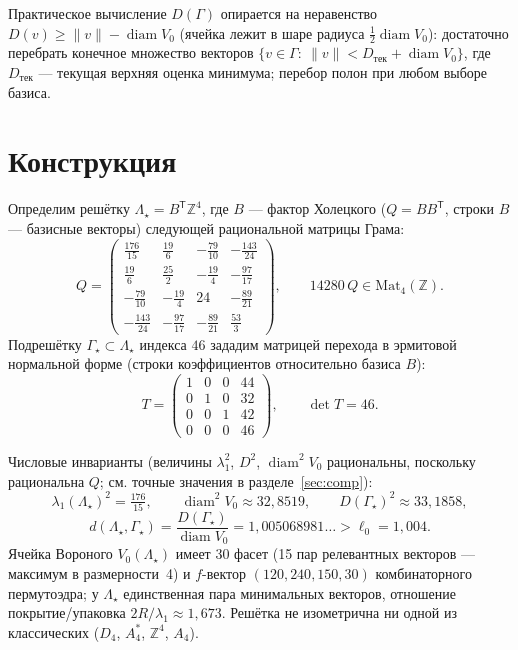 \documentclass[12pt]{article}
\theoremstyle{definition}
\theoremstyle{remark}
\newcommand{\Z}{\mathbb{Z}}
\newcommand{\diam}{\operatorname{diam}}
\begin{document}
Практическое вычисление $D(\Gamma)$ опирается на неравенство
$D(v)\ge\|v\|-\diam V_0$ (ячейка лежит в шаре радиуса $\tfrac12\diam V_0$):
достаточно перебрать конечное множество векторов
$\{v\in\Gamma:\ \|v\|<D_{\text{тек}}+\diam V_0\}$, где $D_{\text{тек}}$ ---
текущая верхняя оценка минимума; перебор полон при любом выборе базиса.

\section{Конструкция}\label{sec:construction}

Определим решётку $\Lambda_\star=B^{\mathsf T}\Z^4$, где $B$ --- фактор
Холецкого ($Q=BB^{\mathsf T}$, строки $B$ --- базисные векторы) следующей
рациональной матрицы Грама:
\begin{equation}\label{eq:gram}
Q=\begin{pmatrix}
\tfrac{176}{15} & \tfrac{19}{6}  & -\tfrac{79}{10} & -\tfrac{143}{24}\\[2pt]
\tfrac{19}{6}   & \tfrac{25}{2}  & -\tfrac{19}{4}  & -\tfrac{97}{17}\\[2pt]
-\tfrac{79}{10} & -\tfrac{19}{4} & 24              & -\tfrac{89}{21}\\[2pt]
-\tfrac{143}{24}& -\tfrac{97}{17}& -\tfrac{89}{21} & \tfrac{53}{3}
\end{pmatrix},
\qquad
14280\,Q\in\mathrm{Mat}_4(\Z).
\end{equation}
Подрешётку $\Gamma_\star\subset\Lambda_\star$ индекса $46$ зададим матрицей
перехода в эрмитовой нормальной форме (строки коэффициентов относительно
базиса $B$):
\begin{equation}\label{eq:hnf}
T=\begin{pmatrix}
1&0&0&44\\
0&1&0&32\\
0&0&1&42\\
0&0&0&46
\end{pmatrix},
\qquad \det T=46 .
\end{equation}

Числовые инварианты (величины $\lambda_1^2$, $D^2$, $\diam^2 V_0$ рациональны,
поскольку рациональна $Q$; см. точные значения в разделе~\ref{sec:comp}):
\[
\lambda_1(\Lambda_\star)^2=\tfrac{176}{15},\qquad
\diam^2 V_0\approx 32{,}8519,\qquad
D(\Gamma_\star)^2\approx 33{,}1858,
\]
\begin{equation}\label{eq:d}
d(\Lambda_\star,\Gamma_\star)=\frac{D(\Gamma_\star)}{\diam V_0}
=1{,}005068981\ldots>\ell_0=1{,}004 .
\end{equation}
Ячейка Вороного $V_0(\Lambda_\star)$ имеет $30$ фасет (15 пар релевантных
векторов --- максимум в размерности~4) и $f$-вектор $(120,240,150,30)$
комбинаторного пермутоэдра; у $\Lambda_\star$ единственная пара минимальных
векторов, отношение покрытие/упаковка $2R/\lambda_1\approx1{,}673$. Решётка не
изометрична ни одной из классических ($D_4$, $A_4^*$, $\Z^4$, $A_4$).
\end{document}
